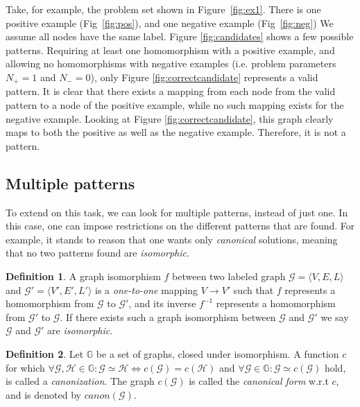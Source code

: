 \documentclass{article}
\theoremstyle{definition}
\newtheorem{definition}{Definition}[section]
\newcommand{\triple}[1]{\ensuremath{\langle #1 \rangle}}
\newcommand{\graph}[1]{\ensuremath{\mathcal{#1}}}
\newcommand{\graphset}[1]{\ensuremath{\mathbb{#1}}}
\begin{document}
Take, for example, the problem set shown in Figure~\ref{fig:ex1}.
There is one positive example (Fig~\ref{fig:pos}), and one negative example (Fig~\ref{fig:neg})
We assume all nodes have the same label.
Figure \ref{fig:candidates} shows a few possible patterns.
Requiring at least one homomorphism with a positive example, and allowing no homomorphisms with negative examples (i.e. problem parameters $N_{+}=1$ and $N_{-}=0$), only Figure \ref{fig:correctcandidate} represents a valid pattern.
It is clear that there exists a mapping from each node from the valid pattern to a node of the positive example, while no such mapping exists for the negative example.
Looking at Figure \ref{fig:correctcandidate}, this graph clearly maps to both the positive as well as the negative example. Therefore, it is not a pattern.

\subsection{Multiple patterns}
To extend on this task, we can look for multiple patterns, instead of just one.
In this case, one can impose restrictions on the different patterns that are found.
For example, it stands to reason that one wants only \emph{canonical} solutions, meaning that no two patterns found are \emph{isomorphic}.

\begin{definition}
\label{def:isomorphism}
A graph isomorphism $f$ between two labeled graph $\graph{G} = \triple{V,E,L}$ and $\graph{G'} = \triple{V',E',L'}$ is a \emph{one-to-one} mapping $V \rightarrow V'$ 
such that $f$ represents a homomorphism from $\graph{G}$ to $\graph{G'}$,
and its inverse $f^{-1}$ represents a homomorphism from $\graph{G'}$ to $\graph{G}$.
If there exists such a graph isomorphism between $\graph{G}$ and $\graph{G'}$ we say $\graph{G}$ and $\graph{G'}$ are \emph{isomorphic}.
\end{definition}


\begin{definition}
\label{def:canonicalForm}
Let $\graphset{G}$ be a set of graphs, closed under isomorphism.
A function $c$ for which $\forall \graph{G,H} \in \graphset{G} : \graph{G} \simeq \graph{H} \iff c(\graph{G}) = c(\graph{H})$ and $\forall \graph{G} \in \graphset{G} : \graph{G} \simeq c(\graph{G})$ hold, is called a \emph{canonization}.
The graph $c(\graph{G})$ is called the \emph{canonical form} w.r.t $c$, and is denoted by $\mathit{canon}(\graph{G})$.
\end{definition}
\end{document}
